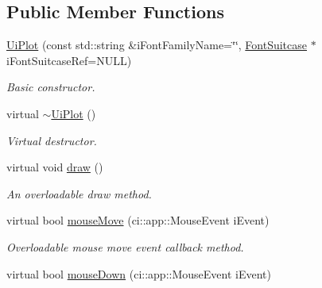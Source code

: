 \subsection*{Public Member Functions}
\begin{DoxyCompactItemize}
\item 
\hypertarget{class_ui_plot_abde1f4cef588a3fd30a6892e78c80cbc}{\hyperlink{class_ui_plot_abde1f4cef588a3fd30a6892e78c80cbc}{Ui\-Plot} (const std\-::string \&i\-Font\-Family\-Name=\char`\"{}\char`\"{}, \hyperlink{class_font_suitcase}{Font\-Suitcase} $\ast$i\-Font\-Suitcase\-Ref=N\-U\-L\-L)}\label{class_ui_plot_abde1f4cef588a3fd30a6892e78c80cbc}

\begin{DoxyCompactList}\small\item\em Basic constructor. \end{DoxyCompactList}\item 
\hypertarget{class_ui_plot_a9bb04d1b64d9a6a48496b35fe63057dc}{virtual \hyperlink{class_ui_plot_a9bb04d1b64d9a6a48496b35fe63057dc}{$\sim$\-Ui\-Plot} ()}\label{class_ui_plot_a9bb04d1b64d9a6a48496b35fe63057dc}

\begin{DoxyCompactList}\small\item\em Virtual destructor. \end{DoxyCompactList}\item 
\hypertarget{class_ui_plot_acc1e3d6aedeec573ce437c9037d6a1dc}{virtual void \hyperlink{class_ui_plot_acc1e3d6aedeec573ce437c9037d6a1dc}{draw} ()}\label{class_ui_plot_acc1e3d6aedeec573ce437c9037d6a1dc}

\begin{DoxyCompactList}\small\item\em An overloadable draw method. \end{DoxyCompactList}\item 
\hypertarget{class_ui_plot_ab85054012a46819e775942fd4636f237}{virtual bool \hyperlink{class_ui_plot_ab85054012a46819e775942fd4636f237}{mouse\-Move} (ci\-::app\-::\-Mouse\-Event i\-Event)}\label{class_ui_plot_ab85054012a46819e775942fd4636f237}

\begin{DoxyCompactList}\small\item\em Overloadable mouse move event callback method. \end{DoxyCompactList}\item 
\hypertarget{class_ui_plot_a783c58010f2f3d94665a02a9e5bc552b}{virtual bool \hyperlink{class_ui_plot_a783c58010f2f3d94665a02a9e5bc552b}{mouse\-Down} (ci\-::app\-::\-Mouse\-Event i\-Event)}\label{class_ui_plot_a783c58010f2f3d94665a02a9e5bc552b}


\end{DoxyCompactItemize}
